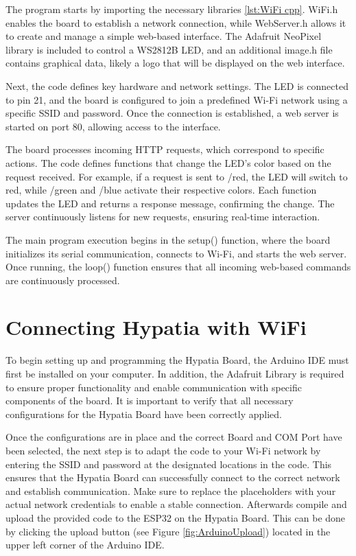 The program starts by importing the necessary libraries \ref{lst:WiFi cpp}. WiFi.h enables the board to establish a network connection, while WebServer.h allows it to create and manage a simple web-based interface. The Adafruit NeoPixel library is included to control a WS2812B LED, and an additional image.h file contains graphical data, likely a logo that will be displayed on the web interface.

Next, the code defines key hardware and network settings. The LED is connected to pin 21, and the board is configured to join a predefined Wi-Fi network using a specific SSID and password. Once the connection is established, a web server is started on port 80, allowing access to the interface.

The board processes incoming HTTP requests, which correspond to specific actions. The code defines functions that change the LED’s color based on the request received. For example, if a request is sent to /red, the LED will switch to red, while /green and /blue activate their respective colors. Each function updates the LED and returns a response message, confirming the change. The server continuously listens for new requests, ensuring real-time interaction.

The main program execution begins in the setup() function, where the board initializes its serial communication, connects to Wi-Fi, and starts the web server. Once running, the loop() function ensures that all incoming web-based commands are continuously processed.

\section{Connecting Hypatia with WiFi}
To begin setting up and programming the Hypatia Board, the Arduino IDE must first be installed on your computer. In addition, the Adafruit Library is required to ensure proper functionality and enable communication with specific components of the board. It is important to verify that all necessary configurations for the Hypatia Board have been correctly applied.

Once the configurations are in place and the correct Board and COM Port have been selected, the next step is to adapt the code to your Wi-Fi network by entering the SSID and password at the designated locations in the code. This ensures that the Hypatia Board can successfully connect to the correct network and establish communication. Make sure to replace the placeholders with your actual network credentials to enable a stable connection. Afterwards compile and upload the provided code to the ESP32 on the Hypatia Board. This can be done by clicking the upload button (see Figure \ref{fig:ArduinoUpload}) located in the upper left corner of the Arduino IDE.

